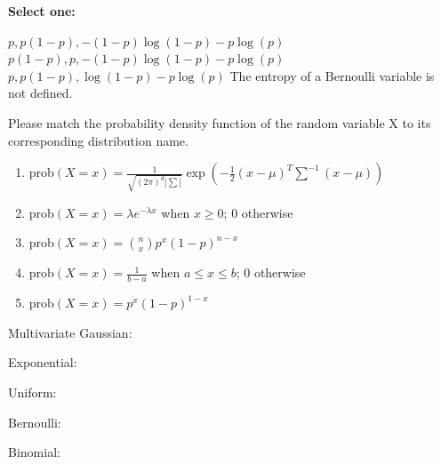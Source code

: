 \documentclass[11pt,addpoints,answers]{exam}
\numberwithin{equation}{section} %
\numberwithin{figure}{section} %
\numberwithin{table}{section} %
\begin{document}
\begin{questions}
    \textbf{Select one:}
    \begin{checkboxes}
        \choice $p, p(1-p), -(1-p)\log(1-p)-p \log(p)$
        \choice $p(1-p), p, -(1-p)\log(1-p)-p\log(p)$
        \choice $p, p(1-p),\log(1-p)-p\log(p)$
        \choice The entropy of a Bernoulli variable is not defined.
    \end{checkboxes}
    


    \question[2] Please match the probability density function of the random variable X to its corresponding distribution name.
    
    
    \begin{enumerate}
        \item  prob$(X=x) = \frac{1}{\sqrt{(2\pi)^d |\sum|}}\exp(-\frac{1}{2}(x - \mu)^T\sum^{-1}(x-\mu))$
        \item  prob$(X=x) = \lambda e^{-\lambda x}$ when $x \geq 0$; 0 otherwise
        \item  prob$(X=x) = \binom{n}{x} p^x (1-p)^{n-x}$
        \item  prob$(X=x) = \frac{1}{b-a}$ when $a \leq x \leq b$; 0 otherwise
        \item  prob$(X=x) = p^x(1-p)^{1-x}$
    \end{enumerate}
    
    \begin{list}{}
        \item Multivariate Gaussian:  \qquad
            \begin{tcolorbox}[fit,height=1cm, width=2cm, blank, borderline={1pt}{-2pt},nobeforeafter]
            \end{tcolorbox}
        \item Exponential:  \qquad
            \begin{tcolorbox}[fit,height=1cm, width=2cm, blank, borderline={1pt}{-2pt},nobeforeafter]
            \end{tcolorbox}
        \item Uniform:  \qquad         
            \begin{tcolorbox}[fit,height=1cm, width=2cm, blank, borderline={1pt}{-2pt},nobeforeafter]
            \end{tcolorbox}
        \item Bernoulli:  \qquad             
            \begin{tcolorbox}[fit,height=1cm, width=2cm, blank, borderline={1pt}{-2pt},nobeforeafter]
            \end{tcolorbox}
        \item Binomial:  \qquad             
            \begin{tcolorbox}[fit,height=1cm, width=2cm, blank, borderline={1pt}{-2pt},nobeforeafter]
            \end{tcolorbox}
    \end{list}

    
    
    
    

    \clearpage
\end{questions}
\end{document}
